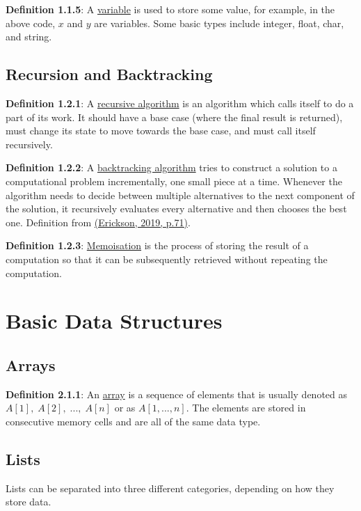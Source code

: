 \documentclass{article}
\newcommand{\separate}[1] {\vspace{#1 pt}\noindent}
\newcommand{\definition}[2]{\textbf{Definition #1}: #2\label{def:#1}}
\begin{document}
\noindent\definition{1.1.5}{A \underline{variable} is used to store some value, for example, in the above code, \(x\) and \(y\) are variables. Some basic types include integer, float, char, and string.}

\subsection{Recursion and Backtracking}

\definition{1.2.1}{A \underline{recursive algorithm} is an algorithm which calls itself to do a part of its work. It should have a base case (where the final result is returned), must change its state to move towards the base case, and must call itself recursively.}

\separate{5}\definition{1.2.2}{A \underline{backtracking algorithm} tries to construct a solution to a computational problem incrementally, one small piece at a time. Whenever the algorithm needs to decide between multiple alternatives to the next component of the solution, it recursively evaluates every alternative and then chooses the best one.} Definition from \hyperref[cit:1.algorithms]{(Erickson, 2019, p.71)}.

\separate{5}\definition{1.2.3}{\underline{Memoisation} is the process of storing the result of a computation so that it can be subsequently retrieved without repeating the computation.}

\newpage\section{Basic Data Structures}

\subsection{Arrays}

\definition{2.1.1}{An \underline{array} is a sequence of elements that is usually denoted as \(A[1], \; A[2], \; ..., \; A[n]\) or as \(A[1,...,n]\).} The elements are stored in consecutive memory cells and are all of the same data type. 

\subsection{Lists}

Lists can be separated into three different categories, depending on how they store data. 
\end{document}
